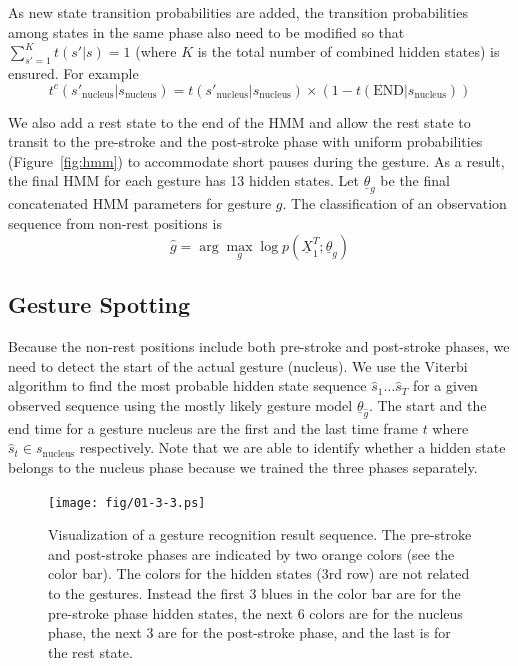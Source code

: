 \documentclass{acm_proc_article-sp}
\begin{document}
As new state transition probabilities are added, the transition probabilities among
states in the same phase also need to be modified so that $\sum_{s' = 1}^K t(s'|s) = 1$ (where
$K$ is the total number of combined hidden states) is ensured. For example
\begin{displaymath}
t^c(s'_{\text{nucleus}} | s_{\text{nucleus}}) = t(s'_{\text{nucleus}} | s_{\text{nucleus}})
  \times (1 - t(\text{END} | s_{\text{nucleus}}))
\end{displaymath}

We also add a rest state to the end of the HMM and allow the rest state to transit to the pre-stroke
and the post-stroke phase with uniform probabilities (Figure~\ref{fig:hmm}) to accommodate short pauses during the gesture.
As a result, the final HMM for each gesture has 13 hidden states.
Let $\underline{\theta}_g$ be the final concatenated HMM parameters for gesture $g$. The classification
of an observation sequence from non-rest positions is 
\begin{displaymath}
\hat{g} = \arg\max_g\log p(\underline{X}_1^T; \underline{\theta}_g)
\end{displaymath}

\subsection{Gesture Spotting}
Because the non-rest positions include both pre-stroke and post-stroke phases, we need
to detect the start of the actual gesture (nucleus). We use the Viterbi algorithm
to find the most probable hidden state sequence $\hat{s}_1\ldots\hat{s}_T$ for a given observed sequence using 
the mostly likely gesture model $\underline{\theta}_{\hat{g}}$. The start and the end time for a gesture nucleus are
the first and the last time frame $t$ where $\hat{s}_t\in s_{\text{nucleus}}$ respectively. Note that
we are able to identify whether a hidden state belongs to the nucleus phase because we trained the three phases
separately.

\begin{figure}[tb]
\centering
\texttt{[image: fig/01-3-3.ps]}
\caption{Visualization of a gesture recognition result sequence. 
The pre-stroke and post-stroke phases are indicated by two orange colors (see the color bar). 
The colors for the hidden states (3rd row) are not related 
to the gestures. Instead the first 3 blues in the color bar are for the pre-stroke phase hidden states, the next 6 colors are for the nucleus
phase, the next 3 are for the post-stroke phase, and the last is for the rest state.}
\label{fig:decoding}
\end{figure}
\end{document}
